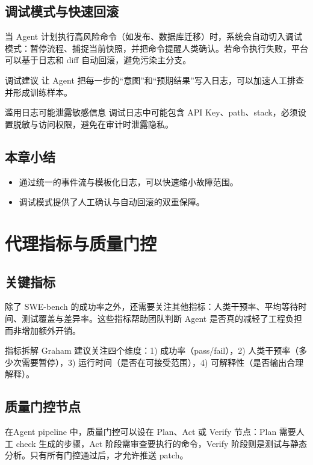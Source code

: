 \documentclass[a4paper]{article}
\begin{document}
\subsection{调试模式与快速回滚}
当 Agent 计划执行高风险命令（如发布、数据库迁移）时，系统会自动切入调试模式：暂停流程、捕捉当前快照，并把命令提醒人类确认。若命令执行失败，平台可以基于日志和 diff 自动回滚，避免污染主分支。

\begin{knowledgebox}{调试建议}
让 Agent 把每一步的“意图”和“预期结果”写入日志，可以加速人工排查并形成训练样本。
\end{knowledgebox}

\begin{warningbox}{滥用日志可能泄露敏感信息}
调试日志中可能包含 API Key、path、stack，必须设置脱敏与访问权限，避免在审计时泄露隐私。
\end{warningbox}

\subsection{本章小结}
\begin{itemize}
    \item 通过统一的事件流与模板化日志，可以快速缩小故障范围。
    \item 调试模式提供了人工确认与自动回滚的双重保障。
\end{itemize}

\section{代理指标与质量门控}
\subsection{关键指标}
除了 SWE-bench 的成功率之外，还需要关注其他指标：人类干预率、平均等待时间、测试覆盖与差异率。这些指标帮助团队判断 Agent 是否真的减轻了工程负担而非增加额外开销。

\begin{importantbox}{指标拆解}
Graham 建议关注四个维度：1) 成功率（pass/fail），2) 人类干预率（多少次需要暂停），3) 运行时间（是否在可接受范围），4) 可解释性（是否输出合理解释）。
\end{importantbox}

\subsection{质量门控节点}
在Agent pipeline 中，质量门控可以设在 Plan、Act 或 Verify 节点：Plan 需要人工 check 生成的步骤，Act 阶段需审查要执行的命令，Verify 阶段则是测试与静态分析。只有所有门控通过后，才允许推送 patch。
\end{document}
